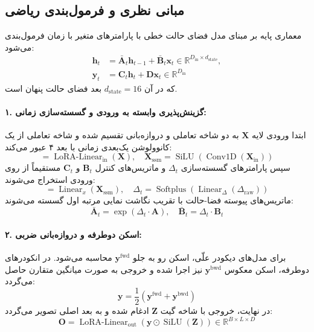 \subsection{مبانی نظری و فرمول‌بندی ریاضی}
معماری پایه بر مبنای مدل فضای حالت خطی با پارامترهای متغیر با زمان فرمول‌بندی می‌شود:
\begin{align}
\mathbf{h}_t &= \bar{\mathbf{A}}_t \mathbf{h}_{t-1} + \bar{\mathbf{B}}_t \mathbf{x}_t \in \mathbb{R}^{D_{\text{in}} \times d_{\text{state}}}, \\
\mathbf{y}_t &= \mathbf{C}_t \mathbf{h}_t + \mathbf{D} \mathbf{x}_t \in \mathbb{R}^{D_{\text{in}}}
\end{align}
که در آن $d_{\text{state}} = 16$ بعد فضای حالت پنهان است.

\paragraph{۱. گزینش‌پذیری وابسته به ورودی و گسسته‌سازی زمانی:}
ابتدا ورودی لایه $\mathbf{X}$ به دو شاخه تعاملی و دروازه‌بانی تقسیم شده و شاخه تعاملی از یک کانوولوشن یک‌بعدی زمانی با بعد ۴ عبور می‌کند:
\begin{equation}
[\mathbf{X}_{\text{in}}, \mathbf{Z}] = \operatorname{LoRA-Linear}_{\text{in}}(\mathbf{X}), \quad \mathbf{X}_{\text{ssm}} = \operatorname{SiLU}(\operatorname{Conv1D}(\mathbf{X}_{\text{in}}))
\end{equation}
سپس پارامترهای گسسته‌سازی $\Delta_t$ و ماتریس‌های کنترل $\mathbf{B}_t$ و $\mathbf{C}_t$ مستقیماً از روی ورودی استخراج می‌شوند:
\begin{equation}
[\Delta_{\text{raw}}, \mathbf{B}_t, \mathbf{C}_t] = \operatorname{Linear}_x(\mathbf{X}_{\text{ssm}}), \quad \Delta_t = \operatorname{Softplus}(\operatorname{Linear}_{\Delta}(\Delta_{\text{raw}}))
\end{equation}
ماتریس‌های پیوسته فضا-حالت با تقریب نگاشت نمایی مرتبه اول گسسته می‌شوند:
\begin{equation}
\bar{\mathbf{A}}_t = \exp(\Delta_t \cdot \mathbf{A}), \quad \bar{\mathbf{B}}_t = \Delta_t \cdot \mathbf{B}_t
\end{equation}

\paragraph{۲. اسکن دوطرفه و دروازه‌بانی ضربی:}
برای مدل‌های دیکودر علّی، اسکن رو به جلو $\mathbf{y}^{\text{fwd}}$ محاسبه می‌شود. در انکودرهای دوطرفه، اسکن معکوس $\mathbf{y}^{\text{bwd}}$ نیز اجرا شده و خروجی به صورت میانگین متقارن حاصل می‌گردد:
\begin{equation}
\mathbf{y} = \frac{1}{2}\left(\mathbf{y}^{\text{fwd}} + \mathbf{y}^{\text{bwd}}\right)
\end{equation}
در نهایت، خروجی با شاخه گیت $\mathbf{Z}$ ادغام شده و به بعد اصلی تصویر می‌گردد:
\begin{equation}
\mathbf{O} = \operatorname{LoRA-Linear}_{\text{out}}(\mathbf{y} \odot \operatorname{SiLU}(\mathbf{Z})) \in \mathbb{R}^{B \times L \times D}
\end{equation}

